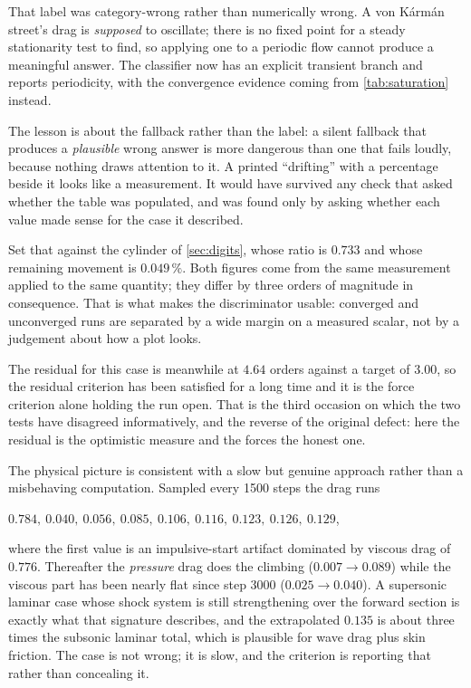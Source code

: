 That label was category-wrong rather than numerically wrong. A von K\'arm\'an street's
drag is \emph{supposed} to oscillate; there is no fixed point for a steady stationarity
test to find, so applying one to a periodic flow cannot produce a meaningful answer. The
classifier now has an explicit transient branch and reports periodicity, with the
convergence evidence coming from \cref{tab:saturation} instead.

The lesson is about the fallback rather than the label: a silent fallback that produces a
\emph{plausible} wrong answer is more dangerous than one that fails loudly, because
nothing draws attention to it. A printed ``drifting'' with a percentage beside
it looks like a measurement. It would have survived any check that asked whether the
table was populated, and was found only by asking whether each value made sense for the
case it described.

Set that against the cylinder of \cref{sec:digits}, whose ratio is $0.733$ and whose
remaining movement is $0.049\,\%$. Both figures come from the same measurement applied to
the same quantity; they differ by three orders of magnitude in consequence. That is what
makes the discriminator usable: converged and unconverged runs are separated by a wide
margin on a measured scalar, not by a judgement about how a plot looks.

The residual for this case is meanwhile at $4.64$ orders against a target of $3.00$, so
the residual criterion has been satisfied for a long time and it is the force criterion
alone holding the run open. That is the third occasion on which the two tests have
disagreed informatively, and the reverse of the original defect: here the residual is the
optimistic measure and the forces the honest one.

The physical picture is consistent with a slow but genuine approach rather than a
misbehaving computation. Sampled every \num{1500} steps the drag runs
\begin{center}
  $0.784,\ 0.040,\ 0.056,\ 0.085,\ 0.106,\ 0.116,\ 0.123,\ 0.126,\ 0.129$,
\end{center}
where the first value is an
impulsive-start artifact dominated by viscous drag of $0.776$. Thereafter the
\emph{pressure} drag does the climbing ($0.007\to0.089$) while the viscous part has been
nearly flat since step \num{3000} ($0.025\to0.040$). A supersonic laminar case whose shock
system is still strengthening over the forward section is exactly what that signature
describes, and the extrapolated $0.135$ is about three times the subsonic laminar total,
which is plausible for wave drag plus skin friction. The case is not wrong; it is slow,
and the criterion is reporting that rather than concealing it.

